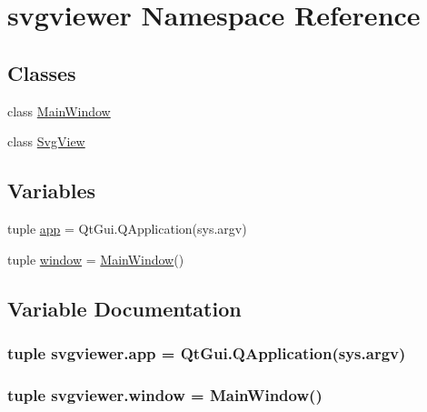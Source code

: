 \hypertarget{namespacesvgviewer}{}\section{svgviewer Namespace Reference}
\label{namespacesvgviewer}
\subsection*{Classes}
\begin{DoxyCompactItemize}
\item 
class \hyperlink{classsvgviewer_1_1MainWindow}{Main\+Window}
\item 
class \hyperlink{classsvgviewer_1_1SvgView}{Svg\+View}
\end{DoxyCompactItemize}
\subsection*{Variables}
\begin{DoxyCompactItemize}
\item 
tuple \hyperlink{namespacesvgviewer_add52085ae0774af5f8c12e27f8679e31}{app} = Qt\+Gui.\+Q\+Application(sys.\+argv)
\item 
tuple \hyperlink{namespacesvgviewer_adb439aadcde8f8dfcb91a1705b8bd089}{window} = \hyperlink{classsvgviewer_1_1MainWindow}{Main\+Window}()
\end{DoxyCompactItemize}


\subsection{Variable Documentation}
\hypertarget{namespacesvgviewer_add52085ae0774af5f8c12e27f8679e31}{}
\subsubsection[{app}]{\setlength{\rightskip}{0pt plus 5cm}tuple svgviewer.\+app = Qt\+Gui.\+Q\+Application(sys.\+argv)}\label{namespacesvgviewer_add52085ae0774af5f8c12e27f8679e31}
\hypertarget{namespacesvgviewer_adb439aadcde8f8dfcb91a1705b8bd089}{}
\subsubsection[{window}]{\setlength{\rightskip}{0pt plus 5cm}tuple svgviewer.\+window = {\bf Main\+Window}()}\label{namespacesvgviewer_adb439aadcde8f8dfcb91a1705b8bd089}
